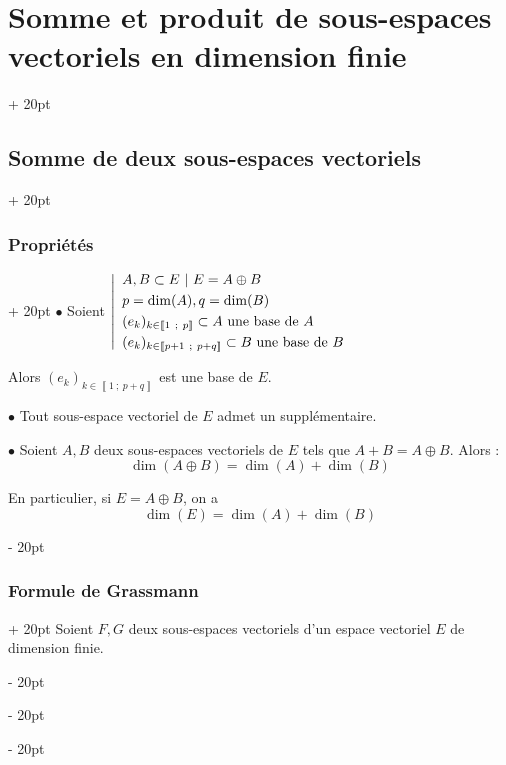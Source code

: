 \documentclass[a4paper, 12pt, twoside]{article}
\newcommand{\nset}[2]{\left\llbracket #1\ ;\ #2 \right\rrbracket}
\newcommand{\ind}[1][20pt]{\advance\leftskip + #1}
\newcommand{\deind}[1][20pt]{\advance\leftskip - #1}
\newenvironment{indt}[2][20pt]{#2 \par \ind[#1]}{\par \deind} %
\begin{document}
\begin{indt}{\section{Somme et produit de sous-espaces vectoriels en dimension finie}}
\begin{indt}{\subsection{Somme de deux sous-espaces vectoriels}}
\begin{indt}{\subsubsection{Propriétés}}
                $\bullet$ Soient
                $
                    \left|
                    \begin{array}{l}
                        A, B \subset E\ |\ E = A \oplus B
                        \vspace{3pt}
                        \\
                        p = \dim(A), q = \dim(B)
                        \vspace{3pt}
                        \\
                        (e_k)_{k \in \nset 1 p} \subset A\ \text{une base de $A$}
                        \vspace{3pt}
                        \\
                        (e_k)_{k \in \nset{p + 1}{p + q}} \subset B\ \text{une base de $B$}
                    \end{array}
                    \right.
                $
                
                \vspace{6pt}
                
                Alors $(e_k)_{k \in \nset 1 {p + q}}$ est une base de $E$.
                
                \vspace{12pt}
                
                $\bullet$ Tout sous-espace vectoriel de $E$ admet un supplémentaire.
                
                \vspace{12pt}
                
                $\bullet$ Soient $A, B$ deux sous-espaces vectoriels de $E$ tels que $A + B = A \oplus B$. Alors :
                    \[ \dim(A \oplus B) = \dim(A) + \dim(B) \]
                
                En particulier, si $E = A \oplus B$, on a
                    \[ \dim(E) = \dim(A) + \dim(B) \]
            \end{indt}
            
            \vspace{12pt}
            
            \begin{indt}{\subsubsection{Formule de Grassmann}}
                Soient $F, G$ deux sous-espaces vectoriels d'un espace vectoriel $E$ de dimension finie.
                

\end{indt}
\end{indt}
\end{indt}
\end{document}
